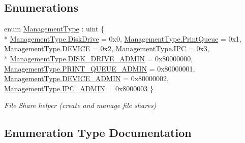 \subsection*{Enumerations}
\begin{DoxyCompactItemize}
\item 
enum \hyperlink{namespace_open_1_1_g_i_1_1hypermart_1_1_helpers_a6b99f1e1d7a403abfd1f2ceb7fcb8e41}{Management\+Type} \+: uint \{ \\*
\hyperlink{namespace_open_1_1_g_i_1_1hypermart_1_1_helpers_a6b99f1e1d7a403abfd1f2ceb7fcb8e41adc8b3ede1c4a7d046b28690397e7bc54}{Management\+Type.\+Disk\+Drive} = 0x0, 
\hyperlink{namespace_open_1_1_g_i_1_1hypermart_1_1_helpers_a6b99f1e1d7a403abfd1f2ceb7fcb8e41ae71bdc4c38933eed3f4694f182f31fd8}{Management\+Type.\+Print\+Queue} = 0x1, 
\hyperlink{namespace_open_1_1_g_i_1_1hypermart_1_1_helpers_a6b99f1e1d7a403abfd1f2ceb7fcb8e41ae10b6ab6a278644ce40631f62f360b6d}{Management\+Type.\+D\+E\+V\+I\+C\+E} = 0x2, 
\hyperlink{namespace_open_1_1_g_i_1_1hypermart_1_1_helpers_a6b99f1e1d7a403abfd1f2ceb7fcb8e41ac8660c6d72e7323867ec800d6bb953df}{Management\+Type.\+I\+P\+C} = 0x3, 
\\*
\hyperlink{namespace_open_1_1_g_i_1_1hypermart_1_1_helpers_a6b99f1e1d7a403abfd1f2ceb7fcb8e41ad99f15606e6e8555c01b7ce7af881006}{Management\+Type.\+D\+I\+S\+K\+\_\+\+D\+R\+I\+V\+E\+\_\+\+A\+D\+M\+I\+N} = 0x80000000, 
\hyperlink{namespace_open_1_1_g_i_1_1hypermart_1_1_helpers_a6b99f1e1d7a403abfd1f2ceb7fcb8e41a155c7c24b15d822ca5c2185df2d3680b}{Management\+Type.\+P\+R\+I\+N\+T\+\_\+\+Q\+U\+E\+U\+E\+\_\+\+A\+D\+M\+I\+N} = 0x80000001, 
\hyperlink{namespace_open_1_1_g_i_1_1hypermart_1_1_helpers_a6b99f1e1d7a403abfd1f2ceb7fcb8e41ad35d20759ddf04ed0b0a3d64aaec699a}{Management\+Type.\+D\+E\+V\+I\+C\+E\+\_\+\+A\+D\+M\+I\+N} = 0x80000002, 
\hyperlink{namespace_open_1_1_g_i_1_1hypermart_1_1_helpers_a6b99f1e1d7a403abfd1f2ceb7fcb8e41a1805889a412e56185f803f04a8d79dcb}{Management\+Type.\+I\+P\+C\+\_\+\+A\+D\+M\+I\+N} = 0x8000003
 \}\begin{DoxyCompactList}\small\item\em File Share helper (create and manage file shares) \end{DoxyCompactList}
\end{DoxyCompactItemize}


\subsection{Enumeration Type Documentation}
\hypertarget{namespace_open_1_1_g_i_1_1hypermart_1_1_helpers_a6b99f1e1d7a403abfd1f2ceb7fcb8e41}{}
